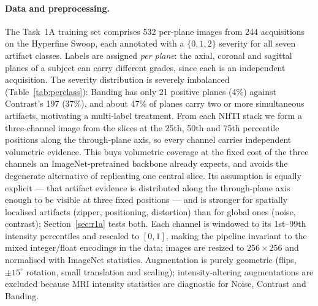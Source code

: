 \documentclass[runningheads]{llncs}
\begin{document}
\paragraph{Data and preprocessing.}
The Task~1A training set comprises 532 per-plane images from 244 acquisitions on
the Hyperfine Swoop, each annotated with a $\{0,1,2\}$ severity for all seven
artifact classes. Labels are assigned \emph{per plane}: the axial, coronal and
sagittal planes of a subject can carry different grades, since each is an
independent acquisition. The severity distribution is severely imbalanced
(Table~\ref{tab:perclass}): Banding has only 21 positive planes (4\%) against
Contrast's 197 (37\%), and about 47\% of planes carry two or more simultaneous
artifacts, motivating a multi-label treatment. From each NIfTI stack we form a
three-channel image from the slices at the 25th, 50th and 75th percentile
positions along the through-plane axis, so every channel carries independent
volumetric evidence. This buys volumetric coverage at the fixed cost of the
three channels an ImageNet-pretrained backbone already expects, and avoids the
degenerate alternative of replicating one central slice. Its assumption is equally
explicit --- that artifact evidence is distributed along the through-plane axis enough
to be visible at three fixed positions --- and is stronger for spatially localised
artifacts (zipper, positioning, distortion) than for global ones (noise, contrast);
Section~\ref{sec:r1a} tests both. Each channel is windowed to its 1st--99th intensity
percentiles and rescaled to $[0,1]$, making the pipeline invariant to the mixed
integer/float encodings in the data; images are resized to $256\times256$ and
normalised with ImageNet statistics. Augmentation is purely geometric
(flips, $\pm15^\circ$ rotation, small translation and scaling); intensity-altering
augmentations are excluded because MRI intensity statistics are diagnostic for
Noise, Contrast and Banding.
\end{document}
